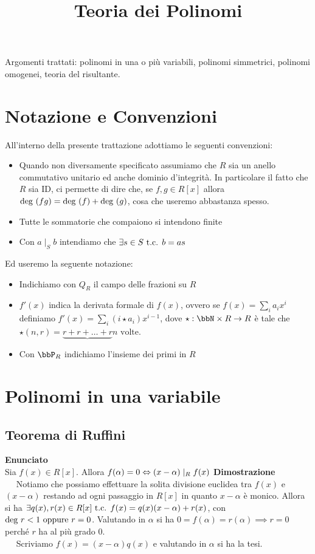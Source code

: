 \documentclass[a4paper,NoNotes,GeneralMath]{stdmdoc}
\newcommand{\Enunciato}{\vskip 0.05cm \noindent \textbf{Enunciato} \\ }
\renewcommand{\Dimostrazione}{\vskip 0.05cm \noindent \textbf{Dimostrazione} \\ }
\begin{document}
	\title{Teoria dei Polinomi}
	Argomenti trattati: polinomi in una o più variabili, polinomi simmetrici, polinomi omogenei, teoria del risultante.

	\section*{Notazione e Convenzioni}
	All'interno della presente trattazione adottiamo le seguenti convenzioni:
	\begin{itemize}
		\item Quando non diversamente specificato assumiamo che $R$ sia un anello commutativo unitario ed anche dominio d'integrità. In particolare il fatto che $R$ sia ID, ci permette di dire che, se $f,g \in R[x]$ allora $\mbox{deg }(fg) = \mbox{deg }(f) + \mbox{deg }(g)$, cosa che useremo abbastanza spesso.
		\item Tutte le sommatorie che compaiono si intendono finite
		\item Con $a \mid_S b$ intendiamo che $\exists s \in S \mbox{ t.c. } b = as$
	\end{itemize} \vskip 0.2cm

	Ed useremo la seguente notazione:
	\begin{itemize}
		\item Indichiamo con $Q_R$ il campo delle frazioni su $R$
		\item $f'(x)$ indica la derivata formale di $f(x)$, ovvero se $f(x) = \sum_i a_i x^i$ definiamo $f'(x) = \sum_i (i\star a_i) x^{i-1}$, dove $\star: \bbN \times R \rar R$ è tale che $\star(n, r) = \underbrace{r + r + \ldots + r}{n \text{ volte}}$.
		\item Con $\bbP_R$ indichiamo l'insieme dei primi in $R$
	\end{itemize}

	\section*{Polinomi in una variabile}

	\subsection{Teorema di Ruffini}
	\Enunciato Sia $f(x) \in R[x]$. Allora $f(\alpha)=0 \Leftrightarrow (x-\alpha) \mid_R f(x)$
	\Dimostrazione \frdx $\quad $ Notiamo che possiamo effettuare la solita divisione euclidea tra $f(x)$ e $(x-\alpha)$ restando ad ogni passaggio in $R[x]$ in quanto $x-\alpha$ è monico. Allora si ha $\exists q(x), r(x) \in R[x] \mbox{ t.c. } f(x) = q(x)(x-\alpha) + r(x)$, con $\mbox{deg } r < 1 \text{ oppure } r = 0$. Valutando in $\alpha$ si ha $0 = f(\alpha) = r(\alpha) \implies r = 0$ perché $r$ ha al più grado $0$. \\
		\frsx $\quad$ Scriviamo $f(x) = (x-\alpha)q(x)$ e valutando in $\alpha$ si ha la tesi.
	
\end{document}
